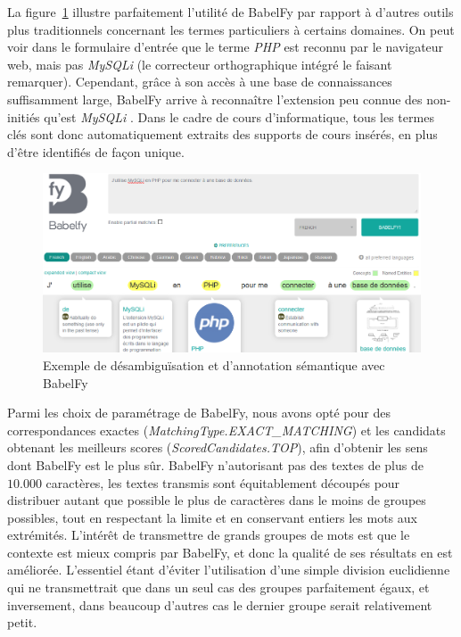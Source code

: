 \bigskip

La figure~\ref{figure:3-I-4-Desambiguisation-BabelFyGUI} illustre parfaitement l'utilité de BabelFy par rapport à d'autres outils plus traditionnels concernant les termes particuliers à certains domaines.
On peut voir dans le formulaire d'entrée que le terme \og \textit{PHP} \fg est reconnu par le navigateur web, mais pas \og \textit{MySQLi} \fg (le correcteur orthographique intégré le faisant remarquer).
Cependant, grâce à son accès à une base de connaissances suffisamment large, BabelFy arrive à reconnaître l'extension peu connue des non-initiés qu'est \og \textit{MySQLi} \fg .
Dans le cadre de cours d'informatique, tous les termes clés sont donc automatiquement extraits des supports de cours insérés, en plus d'être identifiés de façon unique.


\begin{figure}[ht]
\centering
\centerline{  %
\includegraphics[scale=0.54]{3-Methode-CREA/images/1-pre-traitement-semantique/desambiguisation-GUI.png}
}
\caption{Exemple de désambiguïsation et d'annotation sémantique avec BabelFy}
\label{figure:3-I-4-Desambiguisation-BabelFyGUI}
\end{figure}

\bigskip

Parmi les choix de paramétrage de BabelFy, nous avons opté pour des correspondances exactes (\textit{MatchingType.EXACT\_MATCHING}) et les candidats obtenant les meilleurs scores (\textit{ScoredCandidates.TOP}), afin d'obtenir les sens dont BabelFy est le plus sûr.
BabelFy n'autorisant pas des textes de plus de $ 10.000 $ caractères, les textes transmis sont équitablement découpés pour distribuer autant que possible le plus de caractères dans le moins de groupes possibles, tout en respectant la limite et en conservant entiers les mots aux extrémités.
L'intérêt de transmettre de grands groupes de mots est que le contexte est mieux compris par BabelFy, et donc la qualité de ses résultats en est améliorée.
L'essentiel étant d'éviter l'utilisation d'une simple division euclidienne qui ne transmettrait que dans un seul cas des groupes parfaitement égaux, et inversement, dans beaucoup d'autres cas le dernier groupe serait relativement petit.


